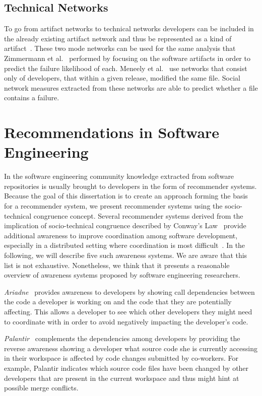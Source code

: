 \subsection{Technical Networks}
\label{chap:6:tn}
To go from artifact networks to technical networks developers can be included in the already existing artifact network and thus be represented as a kind of artifact~\cite{pinzger:fse:2008}.
These two mode networks can be used for the same analysis that Zimmermann et al.~\cite{zimmermann:esem:2009,zimmermann:icse:2008} performed by focusing on the software artifacts in order to predict the failure likelihood of each.
%
Meneely et al.~\cite{meneely:fse:2008} use networks that consist only of developers, that within a given release, modified the same file.
Social network measures extracted from these networks are able to predict whether a file contains a failure.




\section{Recommendations in Software Engineering}
In the software engineering community knowledge extracted from software repositories is usually brought to developers in the form of recommender systems.
Because the goal of this dissertation is to create an approach forming the basis for a recommender system, we present recommender systems using the socio-technical congruence concept.
Several recommender systems derived from the implication of socio-technical congruence described by Conway's Law~\cite{conway:datamination:1968} provide additional awareness to improve coordination among software development, especially in a distributed setting where coordination is most difficult~\cite{olson:hci:2000}.
In the following, we will describe five such awareness systems.
We are aware that this list is not exhaustive. 
Nonetheless, we think that it presents a reasonable overview of awareness systems proposed by software engineering researchers.

\emph{Ariadne}~\cite{trainer2005:ariadne} provides awareness to developers by showing call dependencies between the code a developer is working on and the code that they are potentially affecting.
This allows a developer to see which other developers they might need to coordinate with in order to avoid negatively impacting the developer's code.

\emph{Palantir}~\cite{sarma:cscw:2002} complements the dependencies among developers by providing the reverse awareness  showing a developer what source code she is currently accessing in their workspace is affected by code changes submitted by co-workers.
For example, Palantir indicates which source code files have been changed by other developers that are present in the current workspace and thus might hint at possible merge conflicts.

